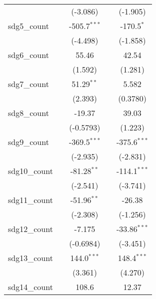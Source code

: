 \begin{tabular}{lcccc}
                     &                  & (-3.086)         &                  & (-1.905)\\   
   sdg5\_count       &                  & -505.7$^{***}$   &                  & -170.5$^{*}$\\   
                     &                  & (-4.498)         &                  & (-1.858)\\   
   sdg6\_count       &                  & 55.46            &                  & 42.54\\   
                     &                  & (1.592)          &                  & (1.281)\\   
   sdg7\_count       &                  & 51.29$^{**}$     &                  & 5.582\\   
                     &                  & (2.393)          &                  & (0.3780)\\   
   sdg8\_count       &                  & -19.37           &                  & 39.03\\   
                     &                  & (-0.5793)        &                  & (1.223)\\   
   sdg9\_count       &                  & -369.5$^{***}$   &                  & -375.6$^{***}$\\   
                     &                  & (-2.935)         &                  & (-2.831)\\   
   sdg10\_count      &                  & -81.28$^{**}$    &                  & -114.1$^{***}$\\   
                     &                  & (-2.541)         &                  & (-3.741)\\   
   sdg11\_count      &                  & -51.96$^{**}$    &                  & -26.38\\   
                     &                  & (-2.308)         &                  & (-1.256)\\   
   sdg12\_count      &                  & -7.175           &                  & -33.86$^{***}$\\   
                     &                  & (-0.6984)        &                  & (-3.451)\\   
   sdg13\_count      &                  & 144.0$^{***}$    &                  & 148.4$^{***}$\\   
                     &                  & (3.361)          &                  & (4.270)\\   
   sdg14\_count      &                  & 108.6            &                  & 12.37\\   

\end{tabular}
